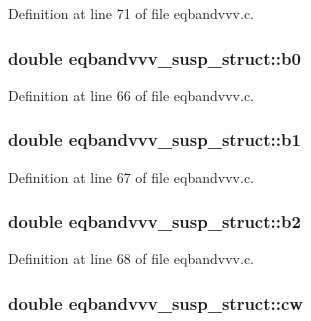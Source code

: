 Definition at line 71 of file eqbandvvv.\+c.

\subsubsection[{\texorpdfstring{b0}{b0}}]{\setlength{\rightskip}{0pt plus 5cm}double eqbandvvv\+\_\+susp\+\_\+struct\+::b0}\hypertarget{structeqbandvvv__susp__struct_aefc586cb0f75d76774d7e1420ef9bd40}{}\label{structeqbandvvv__susp__struct_aefc586cb0f75d76774d7e1420ef9bd40}


Definition at line 66 of file eqbandvvv.\+c.

\subsubsection[{\texorpdfstring{b1}{b1}}]{\setlength{\rightskip}{0pt plus 5cm}double eqbandvvv\+\_\+susp\+\_\+struct\+::b1}\hypertarget{structeqbandvvv__susp__struct_a56c95fa9f1da333f0d04967ad2550e7a}{}\label{structeqbandvvv__susp__struct_a56c95fa9f1da333f0d04967ad2550e7a}


Definition at line 67 of file eqbandvvv.\+c.

\subsubsection[{\texorpdfstring{b2}{b2}}]{\setlength{\rightskip}{0pt plus 5cm}double eqbandvvv\+\_\+susp\+\_\+struct\+::b2}\hypertarget{structeqbandvvv__susp__struct_a8d7e8bd066b1cfbf3e81436873a2d4d8}{}\label{structeqbandvvv__susp__struct_a8d7e8bd066b1cfbf3e81436873a2d4d8}


Definition at line 68 of file eqbandvvv.\+c.

\subsubsection[{\texorpdfstring{cw}{cw}}]{\setlength{\rightskip}{0pt plus 5cm}double eqbandvvv\+\_\+susp\+\_\+struct\+::cw}\hypertarget{structeqbandvvv__susp__struct_a2790e0d8728c31e953b8a400ea1832b0}{}\label{structeqbandvvv__susp__struct_a2790e0d8728c31e953b8a400ea1832b0}



